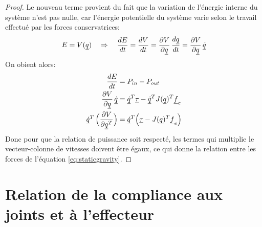 \begin{proof}
Le nouveau terme provient du fait que la variation de l'énergie interne du système n'est pas nulle, car l'énergie potentielle du système varie selon le travail effectué par les forces conservatrices:
\begin{align}
E = V( \underline{q} ) \quad \Rightarrow \quad \frac{dE}{dt} = \frac{dV}{dt} = \frac{\partial V}{ \partial \underline{q}} \, \frac{d \underline{q}}{dt} = \frac{\partial V}{ \partial \underline{q}} \, \underline{\dot{q}}
\end{align}
On obient alors:
\begin{align}
\frac{dE}{dt} &= P_{in} - P_{out} \\
\frac{\partial V}{ \partial \underline{q}} \, \underline{\dot{q}} &=  \underline{\dot{q}}^T \underline{\tau} - \underline{\dot{q}}^T  J( \underline{q})^T \underline{f}_e  \\
\underline{\dot{q}}^T  \, \Big(  \frac{\partial V}{ \partial \underline{q}^T} \Big) &=  \underline{\dot{q}}^T  \Big(\underline{\tau} -  J( \underline{q})^T \underline{f}_e  \Big)
\end{align}
Donc pour que la relation de puissance soit respecté, les termes qui multiplie le vecteur-colonne de vitesses doivent être égaux, ce qui donne la relation entre les forces de l'équation \eqref{eq:staticgravity}.
\end{proof}




\section{Relation de la compliance aux joints et à l'effecteur}
\label{sec:manipcompliance}


